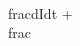 \documentclass[preview]{standalone}
\begin{document}
\begin{center}
\quad\\frac{dI}{dt} + \quad\\frac{}
\end{center}
\end{document}
